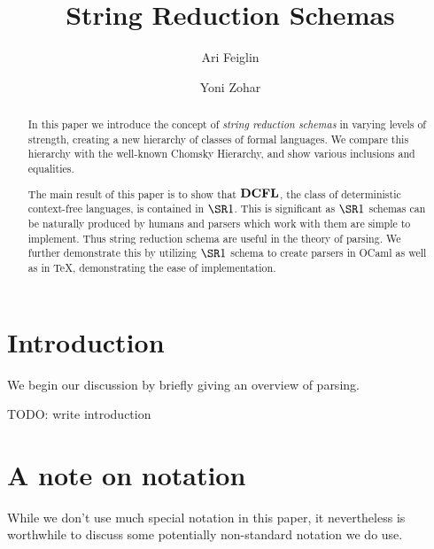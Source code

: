 \documentclass{llncs}
\newcommand{\ari}[1]{{\begin{mdframed}[linecolor=blue]{\color{blue}#1}\end{mdframed}}}
\begin{document}
\title{String Reduction Schemas}
\author{Ari Feiglin\and Yoni Zohar}

\maketitle

\begin{abstract}

    In this paper we introduce the concept of \emph{string reduction schemas} in varying levels of strength, creating a new hierarchy of classes of formal languages.
    We compare this hierarchy with the well-known Chomsky Hierarchy, and show various inclusions and equalities.

    The main result of this paper is to show that $\hbox{{\bf DCFL}}$, the class of deterministic context-free languages, is contained in $\SR1$.
    This is significant as $\SR1$ schemas can be naturally produced by humans and parsers which work with them are simple to implement.
    Thus string reduction schema are useful in the theory of parsing.
    We further demonstrate this by utilizing $\SR1$ schema to create parsers in OCaml as well as in \TeX, demonstrating the ease of implementation.


\end{abstract}

\section{Introduction}

We begin our discussion by briefly giving an overview of parsing.

\ari{TODO: write introduction}

\section{A note on notation}

While we don't use much special notation in this paper, it nevertheless is worthwhile to discuss some potentially non-standard notation we do use.
\end{document}
